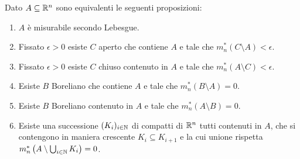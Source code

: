\begin{theorem}\label{thm:LebesgueEquivalenzeMisurabilita}
	Dato $A\subseteq \mathbb R^n$ sono equivalenti le seguenti proposizioni:
	\begin{enumerate}[label=(\arabic*),ref=(\arabic*)]
		\item $A$ è misurabile secondo Lebesgue.\label{it:LEMMisurabile}
		\item Fissato $\epsilon>0$ esiste $C$ aperto che contiene $A$ e tale che $m_n^*(C\setminus A)<\epsilon$. \label{it:LEMApertoFuori}
		\item Fissato $\epsilon>0$ esiste $C$ chiuso contenuto in $A$ e tale che $m_n^*(A\setminus C)<\epsilon$. \label{it:LEMChiusoDentro}
		\item Esiste $B$ Boreliano che contiene $A$ e tale che $m_n^*(B\setminus A)=0$. \label{it:LEMBorelFuori}
		\item Esiste $B$ Boreliano contenuto in $A$ e tale che $m_n^*(A\setminus B)=0$. \label{it:LEMBorelDentro}
		\item Esiste una successione $(K_i)_{i\in\mathbb N}$ di compatti di $\mathbb R^n$ tutti contenuti in $A$, che si contengono in maniera crescente $K_i\subseteq K_{i+1}$ e la cui unione rispetta $m_n^*\left(A\setminus\bigcup_{i\in\mathbb N}K_i\right)=0$. \label{it:LEMCompattiDentro}
	\end{enumerate}
\end{theorem}
